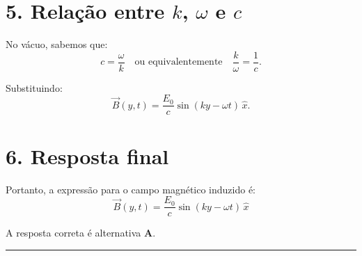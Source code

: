\documentclass[a4paper,12pt]{article}
\begin{document}
\begin{flushleft}
\section*{5. Relação entre \(k\), \(\omega\) e \(c\)}

No vácuo, sabemos que:
\[
c = \frac{\omega}{k} \quad \text{ou equivalentemente} \quad \frac{k}{\omega} = \frac{1}{c}.
\]

Substituindo:
\[
\vec{B}(y,t) = \frac{E_0}{c} \sin(k y - \omega t) \, \hat{x}.
\]

\section*{6. Resposta final}

Portanto, a expressão para o campo magnético induzido é:
\[
\boxed{
\vec{B}(y,t) = \frac{E_0}{c} \sin(k y - \omega t) \, \hat{x}
}
\]


A resposta correta é alternativa \colorbox{green!50}{\textbf{A}}.
\end{flushleft}

\noindent\rule{\linewidth}{0.6pt}\\
\end{document}
